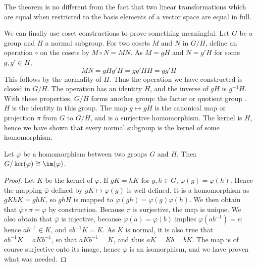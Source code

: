 The theorem is no different from the fact that two linear transformations which are equal when restricted to the basis elements of a vector space are equal in full.

We can finally use coset constructions to prove something meaningful. Let $G$ be a group and $H$ a normal subgroup. For two cosets $M$ and $N$ in $G/H$, define an operation $\circ$ on the cosets by $M \circ N = MN$. As $M = gH$ and $N = g'H$ for some $g,g' \in H$,
%
\[ MN = gHg'H = gg'HH = gg'H \]
%
This follows by the normality of $H$. Thus the operation we have constructed is closed in $G/H$. The operation has an identity $H$, and the inverse of $gH$ is $g^{-1}H$. With these properties, $G/H$ forms another group: the factor or quotient group  . $H$ is the identity in this group. The map $g \mapsto gH$ is the canonical map or projection $\pi$ from $G$ to $G/H$, and is a surjective homomorphism. The kernel is $H$, hence we have shown that every normal subgroup is the kernel of some homomorphism.

\begin{theorem} 
Let $\varphi$ be a homomorphism between two groups $G$ and $H$. Then $G/\ker(\varphi) \cong \im(\varphi)$.
\end{theorem}
\begin{proof}
    Let $K$ be the kernel of $\varphi$. If $gK = hK$ for $g,h \in G$, $\varphi(g) = \varphi(h)$. Hence the mapping $\overline{\varphi}$ defined by $gK \mapsto \varphi(g)$ is well defined. It is a homomorphism as $gKhK = ghK$, so $ghH$ is mapped to $\varphi(gh) = \varphi(g)\varphi(h)$. We then obtain that $\overline{\varphi} \circ \pi = \varphi$ by construction. Because $\pi$ is surjective, the map is unique. We also obtain that $\overline{\varphi}$ is injective, because $\varphi(a) = \varphi(b)$ implies $\varphi(ab^{-1}) = e$; hence $ab^{-1} \in K$, and $ab^{-1}K = K$. As $K$ is normal, it is also true that $ab^{-1}K = aKb^{-1}$, so that $aKb^{-1} = K$, and thus $aK = Kb = bK$. The map is of course surjective onto its image, hence $\overline{\varphi}$ is an isomorphism, and we have proven what was needed.
\end{proof}

\begin{wrapfigure}{1}{3.5cm}
\end{wrapfigure}

